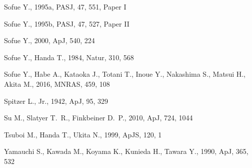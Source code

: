\documentclass[useAMS,usenatbib]{mn2e}
\begin{document}
\begin{thebibliography}{}
 Sofue Y., 1995a, PASJ, 47, 551, Paper I 

 Sofue Y., 1995b, PASJ, 47, 527, Paper II  

 Sofue Y., 2000, ApJ, 540, 224      
 

 Sofue Y., Handa T., 1984, Natur, 310, 568 

 Sofue Y., Habe A., Kataoka J., Totani T., Inoue Y., Nakashima S., Matsui H., Akita M., 2016, MNRAS, 459, 108  
 
 Spitzer L., Jr., 1942, ApJ, 95, 329 


 Su M., Slatyer T.~R., Finkbeiner D.~P., 2010, ApJ, 724, 1044 




 Tsuboi M., Handa T., Ukita N., 1999, ApJS, 120, 1   

 Yamauchi S., Kawada M., Koyama K., Kunieda H., Tawara Y., 1990, ApJ, 365, 532 
 

\end{thebibliography} 
\end{document}
